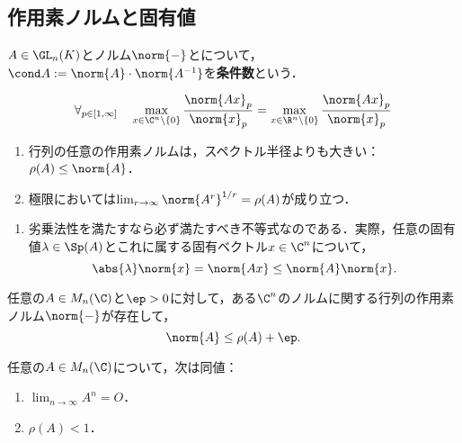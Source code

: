 \documentclass[uplatex, dvipdfmx]{jsreport}
\begin{document}
\subsection{作用素ノルムと固有値}

\begin{definition}
    $A\in\GL_n(K)$とノルム$\norm{-}$とについて，
    $\cond A:=\norm{A}\cdot\norm{A^{-1}}$を\textbf{条件数}という．
\end{definition}

\begin{lemma}
    \[\forall_{p\in[1,\infty]}\quad\max_{x\in\C^n\setminus\{0\}}\frac{\norm{Ax}_p}{\norm{x}_p}=\max_{x\in\R^n\setminus\{0\}}\frac{\norm{Ax}_p}{\norm{x}_p}\]
\end{lemma}

\begin{theorem}[スペクトル半径と作用素ノルム]\mbox{}
    \begin{enumerate}
        \item 行列の任意の作用素ノルムは，スペクトル半径よりも大きい：$\rho(A)\le\norm{A}$．
        \item 極限においては$\lim_{r\to\infty}\norm{A^r}^{1/r}=\rho(A)$が成り立つ．
    \end{enumerate}
\end{theorem}
\begin{Proof}\mbox{}
    \begin{enumerate}
        \item 劣乗法性を満たすなら必ず満たすべき不等式なのである．実際，任意の固有値$\lambda\in\Sp(A)$とこれに属する固有ベクトル$x\in\C^n$について，
        \[\abs{\lambda}\norm{x}=\norm{Ax}\le\norm{A}\norm{x}.\]
    \end{enumerate}
\end{Proof}

\begin{theorem}[行列ノルムの稠密性?]
    任意の$A\in M_n(\C)$と$\ep>0$に対して，ある$\C^n$のノルムに関する行列の作用素ノルム$\norm{-}$が存在して，
    \[\norm{A}\le\rho(A)+\ep.\]
\end{theorem}

\begin{corollary}
    任意の$A\in M_n(\C)$について，次は同値：
    \begin{enumerate}
        \item $\lim_{n\to\infty}A^n=O$．
        \item $\rho(A)<1$．
    \end{enumerate}
\end{corollary}
\end{document}
